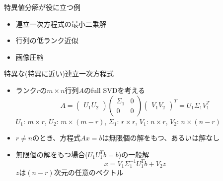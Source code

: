 \begin{frame}[t,fragile]{特異値分解が役に立つ例}
  \begin{itemize}
  \item 連立一次方程式の最小二乗解
  \item 行列の低ランク近似
  \item 画像圧縮
  \end{itemize}
\end{frame}

\begin{frame}[t,fragile]{特異な(特異に近い)連立一次方程式}
  \begin{itemize}
  \item ランク$r$の$m \times n$行列$A$のfull SVDを考える
    \[
    A = \begin{pmatrix} U_1 U_2 \end{pmatrix} \begin{pmatrix} \Sigma_1 & 0 \\ 0 & 0 \end{pmatrix} \begin{pmatrix} V_1 V_2 \end{pmatrix}^T = U_1 \Sigma_1 V_1^T
    \]
    $U_1$: $m \times r$, $U_2$: $m \times (m-r)$, $\Sigma_1$: $r \times r$, $V_1$: $n \times r$, $V_2$: $n \times (n-r)$
  \item $r \ne n$のとき、方程式$Ax=b$は無限個の解をもつ、あるいは解なし
  \item 無限個の解をもつ場合($U_1U_1^Tb=b$)の一般解
    \[
    x = V_1 \Sigma_1^{-1} U_1^T b + V_2 z
    \]
    $z$は$(n-r)$次元の任意のベクトル
  \end{itemize}
\end{frame}

